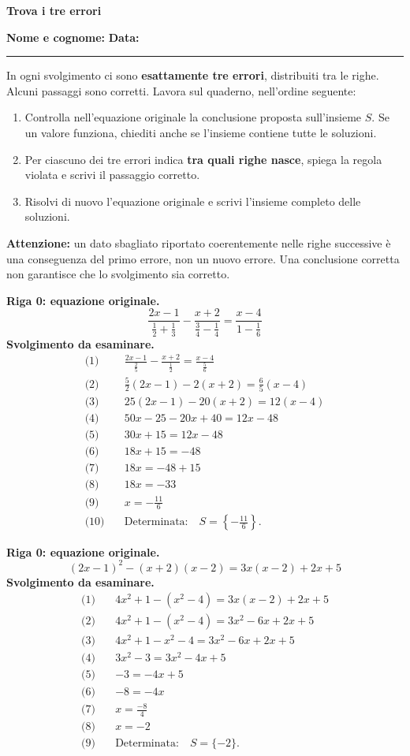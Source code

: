 \documentclass[11pt,a4paper]{article}
\newcommand{\tit}[1]{{\Large\bfseries\color{blu}#1}\par\smallskip}
\newcommand{\sott}[1]{\par\medskip{\large\bfseries\color{blu}#1}\par\smallskip}
\begin{document}
\tit{Trova i tre errori}
\textbf{Nome e cognome:} \hrulefill\quad\textbf{Data:} \rule{2.6cm}{0.4pt}\par
In ogni svolgimento ci sono \textbf{esattamente tre errori}, distribuiti tra le righe.
Alcuni passaggi sono corretti. Lavora sul quaderno, nell’ordine seguente:
\begin{enumerate}
\item Controlla nell’equazione originale la conclusione proposta sull’insieme $S$.
      Se un valore funziona, chiediti anche se l’insieme contiene tutte le soluzioni.
\item Per ciascuno dei tre errori indica \textbf{tra quali righe nasce}, spiega la regola
      violata e scrivi il passaggio corretto.
\item Risolvi di nuovo l’equazione originale e scrivi l’insieme completo delle soluzioni.
\end{enumerate}
\textbf{Attenzione:} un dato sbagliato riportato coerentemente nelle righe successive è una
conseguenza del primo errore, non un nuovo errore. Una conclusione corretta non garantisce
che lo svolgimento sia corretto.
\sott{Esercizio 2a}
\textbf{Riga 0: equazione originale.}
\[
\frac{2x-1}{\displaystyle\frac12+\frac13}-\frac{x+2}{\displaystyle\frac34-\frac14}=\frac{x-4}{\displaystyle1-\frac16}
\]
\textbf{Svolgimento da esaminare.}
\[\begin{aligned}
\text{(1)}\quad & \frac{2x-1}{\displaystyle\frac25}-\frac{x+2}{\displaystyle\frac12}=\frac{x-4}{\displaystyle\frac56}\\
\text{(2)}\quad & \frac52(2x-1)-2(x+2)=\frac65(x-4)\\
\text{(3)}\quad & 25(2x-1)-20(x+2)=12(x-4)\\
\text{(4)}\quad & 50x-25-20x+40=12x-48\\
\text{(5)}\quad & 30x+15=12x-48\\
\text{(6)}\quad & 18x+15=-48\\
\text{(7)}\quad & 18x=-48+15\\
\text{(8)}\quad & 18x=-33\\
\text{(9)}\quad & x=-\frac{11}{6}\\
\text{(10)}\quad & \text{Determinata:}\quad S=\left\{-\frac{11}{6}\right\}.
\end{aligned}\]
\sott{Esercizio 2b}
\textbf{Riga 0: equazione originale.}
\[
(2x-1)^2-(x+2)(x-2)=3x(x-2)+2x+5
\]
\textbf{Svolgimento da esaminare.}
\[\begin{aligned}
\text{(1)}\quad & 4x^2+1-(x^2-4)=3x(x-2)+2x+5\\
\text{(2)}\quad & 4x^2+1-(x^2-4)=3x^2-6x+2x+5\\
\text{(3)}\quad & 4x^2+1-x^2-4=3x^2-6x+2x+5\\
\text{(4)}\quad & 3x^2-3=3x^2-4x+5\\
\text{(5)}\quad & -3=-4x+5\\
\text{(6)}\quad & -8=-4x\\
\text{(7)}\quad & x=\frac{-8}{4}\\
\text{(8)}\quad & x=-2\\
\text{(9)}\quad & \text{Determinata:}\quad S=\{-2\}.
\end{aligned}\]
\end{document}
